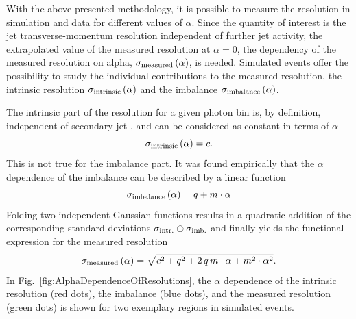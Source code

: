 With the above presented methodology, it is possible to measure the resolution in simulation and data for different values of $\alpha$.
Since the quantity of interest is the jet transverse-momentum resolution independent of further jet activity, \ie the extrapolated value of the measured resolution at $\alpha=0$, 
the dependency of the measured resolution on alpha, $\sigma_\mathrm{measured} \left( \alpha \right)$, is needed.
Simulated events offer the possibility to study the individual contributions to the measured resolution, the intrinsic resolution $\sigma_\mathrm{intrinsic}\left( \alpha \right)$ and the imbalance $\sigma_\mathrm{imbalance}\left( \alpha \right)$.%

The intrinsic part of the resolution for a given photon \pt bin is, by definition, independent of secondary jet \pt, and can be considered as constant in terms of $\alpha$
\begin{equation}\label{eq:intrinsic}
 \sigma_\mathrm{intrinsic} \left( \alpha\right) = c.
\end{equation}
This is not true for the imbalance part. 
It was found empirically that the $\alpha$ dependence of the imbalance can be described by a linear function~\cite{CMS:PAS:JETResolution_7TeV} 
\begin{equation}\label{eq:imbalance}
  \sigma_\mathrm{imbalance} \left( \alpha\right) = q + m \cdot \alpha
\end{equation}
Folding two independent Gaussian functions results in a quadratic addition of the corresponding standard deviations $\sigma_\mathrm{intr.}\oplus\sigma_\mathrm{imb.}$ and finally yields the functional expression for the measured resolution
\begin{equation}\label{eq:total}
  \sigma_\mathrm{measured} \left( \alpha \right) = \sqrt{ c^2 + q^2  + 2\, q\, m \cdot \alpha +m^2 \cdot \alpha^2}. 
\end{equation}
In Fig.~\ref{fig:AlphaDependenceOfResolutions}, the $\alpha$ dependence of the intrinsic resolution (red dots), the imbalance (blue dots), and the measured resolution (green dots) is shown for two exemplary \ptgamma regions in simulated events. 
